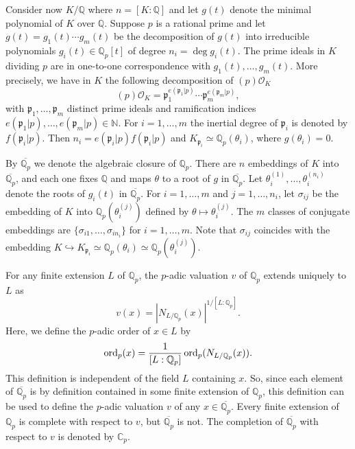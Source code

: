Consider now $K/\mathbb{Q}$ where $n = [K:\mathbb{Q}]$ and let $g(t)$ denote the minimal polynomial of $K$ over $\mathbb{Q}$. Suppose $p$ is a rational prime and let $g(t) = g_1(t) \cdots g_m(t)$ be the decomposition of $g(t)$ into irreducible polynomials $g_i(t) \in \mathbb{Q}_p[t]$ of degree $n_i = \deg g_i(t)$. The prime ideals in $K$ dividing $p$ are in one-to-one correspondence with $g_1(t), \dots, g_m(t)$. More precisely, we have in $K$ the following decomposition of $(p)\mathcal{O}_K$
\[(p)\mathcal{O}_K = \mathfrak{p}_1^{e(\mathfrak{p}_1|p)} \cdots \mathfrak{p}_m^{e(\mathfrak{p}_m|p)},\]
with $\mathfrak{p}_1, \dots, \mathfrak{p}_m$ distinct prime ideals and ramification indices $e(\mathfrak{p}_1 | p), \dots, e(\mathfrak{p}_m | p) \in \mathbb{N}$. For $i = 1, \dots, m$ the inertial degree of $\mathfrak{p}_i$ is denoted by $f(\mathfrak{p}_i|p)$. Then $n_i = e(\mathfrak{p}_i | p)f(\mathfrak{p}_i | p)$ and $K_{\mathfrak{p}_i} \simeq \mathbb{Q}_p(\theta_i)$, where $g(\theta_i) = 0$. 

By $\overline{\mathbb{Q}_p}$ we denote the algebraic closure of $\mathbb{Q}_p$. There are $n$ embeddings of $K$ into $\overline{\mathbb{Q}_p}$, and each one fixes $\mathbb{Q}$ and maps $\theta$ to a root of $g$ in $\overline{\mathbb{Q}_p}$. Let $\theta_i^{(1)}, \dots, \theta_i^{(n_i)}$ denote the roots of $g_i(t)$ in $\overline{\mathbb{Q}_p}$. For $i = 1, \dots, m$ and $j = 1, \dots, n_i$, let $\sigma_{ij}$ be the embedding of $K$ into $\mathbb{Q}_p(\theta_i^{(j)})$ defined by $\theta \mapsto \theta_i^{(j)}$. The $m$ classes of conjugate embeddings are $\{\sigma_{i1}, \dots, \sigma_{in_i}\}$ for $i = 1, \dots, m$. Note that $\sigma_{ij}$ coincides with the embedding $K \hookrightarrow K_{\mathfrak{p}_i} \simeq \mathbb{Q}_p(\theta_i) \simeq \mathbb{Q}_p(\theta_i^{(j)})$. 

For any finite extension $L$ of $\mathbb{Q}_p$, the $p$-adic valuation $v$ of $\mathbb{Q}_p$ extends uniquely to $L$ as 
\[v(x) = |N_{L/\mathbb{Q}_p}(x)|^{1/[L:\mathbb{Q}_p]}.\]
Here, we define the $p$-adic order of $x \in L$ by
\[\operatorname{ord}_p(x) = \frac{1}{[L:\mathbb{Q}_p]}\operatorname{ord}_p(N_{L/\mathbb{Q}_p}(x)).\]
This definition is independent of the field $L$ containing $x$. So, since each element of $\overline{\mathbb{Q}_p}$ is by definition contained in some finite extension of $\mathbb{Q}_p$, this definition can be used to define the $p$-adic valuation $v$ of any $x \in \overline{\mathbb{Q}_p}$. Every finite extension of $\mathbb{Q}_p$ is complete with respect to $v$, but $\overline{\mathbb{Q}_p}$ is not. The completion of $\overline{\mathbb{Q}_p}$ with respect to $v$ is denoted by $\mathbb{C}_p$. 

